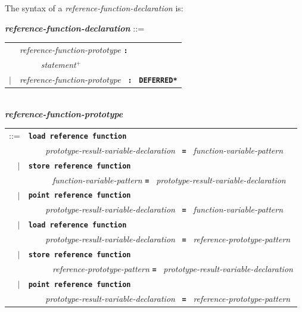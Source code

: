 \documentclass[12pt]{article}
\newcommand{\TT}[1]{{\tt \bfseries #1}}
\newcommand{\PLUS}[1][]{{$^{+#1}$}}
\newcommand{\ttkey}[1]{{\tt \bfseries #1}}
\newcommand{\emkey}[1]{{\em \bfseries #1}}
\newenvironment{indpar}[1][0.3in]%
	{\begin{list}{}%
		     {\setlength{\itemsep}{0in}%
		      \setlength{\topsep}{0in}%
		      \setlength{\parsep}{1ex}%
		      \setlength{\labelwidth}{#1}%
		      \setlength{\leftmargin}{#1}%
		      \addtolength{\leftmargin}{\labelsep}}%
	 \item}%
	{\end{list}}
\begin{document}
The syntax of a {\em reference-function-declaration} is:

\begin{indpar}[0.1in]
\emkey{reference-function-declaration}\label{REFERENCE-FUNCTION-DECLARATION}
	::= \\
\hspace*{2em}
    \begin{tabular}[t]{rl}
        &  {\em reference-function-prototype} \TT{:} \\
	& \TT{~~~~~}{\em statement}\PLUS{} \\
    $|$ &  {\em reference-function-prototype}~ \TT{:}~ \ttkey{*DEFERRED*} \\
    \end{tabular}
\\[2ex]
\emkey{reference-function-prototype}\label{REFERENCE-FUNCTION-PROTOTYPE} \\
\hspace*{0.25in}
    \begin{tabular}[t]{rl}
        ::= & \ttkey{load reference function} \\
	    & \TT{~~~~}{\em prototype-result-variable-declaration}~ \TT{=}~
            	{\em function-variable-pattern} \\
        $|$ & \ttkey{store reference function} \\
	    & \TT{~~~~}~ {\em function-variable-pattern} \TT{=}~
            	{\em prototype-result-variable-declaration} \\
        $|$ & \ttkey{point reference function} \\
	    & \TT{~~~~}{\em prototype-result-variable-declaration}~ \TT{=}~
            	{\em function-variable-pattern} \\
        $|$ & \ttkey{load reference function} \\
	    & \TT{~~~~}{\em prototype-result-variable-declaration}~ \TT{=}~
	        {\em reference-prototype-pattern} \\
        $|$ & \ttkey{store reference function} \\
	    & \TT{~~~~}~ {\em reference-prototype-pattern} \TT{=}~
	        {\em prototype-result-variable-declaration} \\
        $|$ & \ttkey{point reference function} \\
	    & \TT{~~~~}{\em prototype-result-variable-declaration}~ \TT{=}~
	        {\em reference-prototype-pattern} \\
    \end{tabular}
\\[0.5ex]

\end{indpar}
\end{document}
